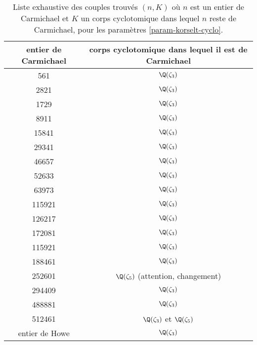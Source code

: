 \begin{table}[H]
	\begin{center}
		\begin{tabular}{|c|c|}
			\hline
			entier de Carmichael & corps cyclotomique dans lequel il est de Carmichael \\
			\hline
			\hline
			561				& $\Q(\zeta_3)$ \\\hline
			2821			& $\Q(\zeta_3)$ \\\hline
			1729			& $\Q(\zeta_3)$ \\\hline
			8911			& $\Q(\zeta_3)$ \\\hline
			15841			& $\Q(\zeta_3)$ \\\hline
			29341			& $\Q(\zeta_3)$ \\\hline
			46657			& $\Q(\zeta_3)$ \\\hline
			52633			& $\Q(\zeta_3)$ \\\hline
			63973			& $\Q(\zeta_3)$ \\\hline
			115921			& $\Q(\zeta_3)$ \\\hline
			126217			& $\Q(\zeta_3)$ \\\hline
			172081			& $\Q(\zeta_3)$ \\\hline
			115921			& $\Q(\zeta_3)$ \\\hline
			188461			& $\Q(\zeta_3)$ \\\hline
			252601			& $\Q(\zeta_5)$ (attention, changement) \\\hline
			294409			& $\Q(\zeta_3)$ \\\hline
			488881			& $\Q(\zeta_3)$ \\\hline
			512461			& $\Q(\zeta_3)$ et $\Q(\zeta_5)$ \\\hline
			entier de Howe	& $\Q(\zeta_3)$ \\\hline
		\end{tabular}
	\end{center}
	\caption{Liste exhaustive des couples trouvés $(n, K)$ où $n$ est un entier de Carmichael et $K$ un corps cyclotomique dans lequel $n$ reste de Carmichael, pour les paramètres \ref{param-korselt-cyclo}.}
\end{table}


